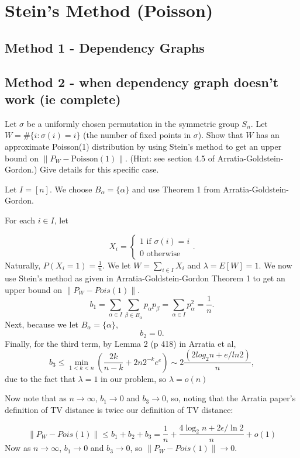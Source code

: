 \documentclass{article}
\newcommand{\answer}[1]{%
  \begin{tcolorbox}[
    colback=gray!9.8,
    boxrule=0.5pt,
    breakable]
  \small #1
  \end{tcolorbox}}
\begin{document}
\section{Stein's Method (Poisson)}




\subsection{Method 1 - Dependency Graphs}

\subsection{Method 2 - when dependency graph doesn't work (ie complete)}

\begin{example}
    Let $\sigma$ be a uniformly chosen permutation in the symmetric group $S_n$. Let $W = \#\{i : \sigma(i) = i\}$ (the number of fixed points in $\sigma$). Show that $W$ has an approximate Poisson(1) distribution by using Stein's method to get an upper bound on $\|P_W - \text{Poisson}(1)\|$. (Hint: see section 4.5 of Arratia-Goldstein-Gordon.) Give details for this specific case.

\answer{
Let $I = [n]$. We choose $B_\alpha = \{\alpha\}$ and use Theorem 1 from Arratia-Goldstein-Gordon. 

For each $i\in I$, let

$$X_i = \begin{cases}
    1 \text{ if } \sigma(i) = i\\
    0 \text{ otherwise}
\end{cases}.$$
Naturally, $P(X_i =1) = \frac{1}{n}$. We let $W = \sum_{i\in I} X_i$ and $\lambda = E[W] = 1$. We now use Stein's method as given in Arratia-Goldstein-Gordon Theorem 1 to get an upper bound on $\lVert P_W - Pois(1)\rVert$.
$$b_1 = \sum_{\alpha\in I} \sum_{\beta \in B_\alpha} p_\alpha p_\beta = \sum_{\alpha \in I} p_\alpha^2 = \frac{1}{n}.$$
Next, because we let $B_\alpha = \{\alpha\}$, 
$$b_2 = 0.$$
Finally, for the third term, by Lemma 2 (p 418) in Arratia et al,
$$b_3 \leq \min_{1<k<n} (\frac{2k}{n-k} + 2n 2^{-k} e^{e})\sim 2\frac{(2log_2 n + e/ln 2)}{n},$$
due to the fact that $\lambda=1$ in our problem, so $\lambda = o(n)$

Now note that as $n\to \infty$, $b_1\to 0$ and $b_3\to 0$, so, noting that the Arratia paper's definition of TV distance is twice our definition of TV distance:

$$\lVert P_W - Pois(1)\rVert\leq b_1 + b_2 + b_3 = \frac{1}{n} + \frac{4\log_2 n + 2\epsilon/\ln 2}{n} + o(1)$$
Now as $n\to \infty$, $b_1 \to 0$ and $b_3 \to 0$, so $\lVert P_W - Pois(1)\rVert \to 0$. 
}
\end{example}
\end{document}
